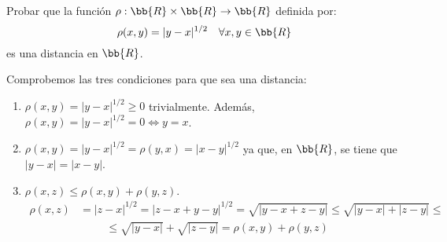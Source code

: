\begin{ejercicio}
    Probar que la función $\rho : \bb{R} \times \bb{R} \rightarrow \bb{R}$ definida por:
    \begin{equation*}
        \rho (x,y)=|y-x|^{1/2} \quad \forall x,y \in \bb{R}
    \end{equation*}
    es una distancia en $\bb{R}$.

    Comprobemos las tres condiciones para que sea una distancia:
    \begin{enumerate}
        \item $\rho (x,y)=|y-x|^{1/2}\geq 0$ trivialmente. Además, $\rho (x,y)=|y-x|^{1/2}=0 \Longleftrightarrow y=x$.

        \item $\rho (x,y)=|y-x|^{1/2}=\rho (y,x)=|x-y|^{1/2}$ ya que, en $\bb{R}$, se tiene que $|y-x|=|x-y|$.

        \item $\rho (x,z)\leq \rho (x,y) + \rho(y,z)$.
        \begin{equation*}\begin{split}
            \rho (x,z)&=|z-x|^{1/2} = |z-x+y-y|^{1/2} = \sqrt{|y-x+z-y|}
            \leq \sqrt{|y-x|+|z-y|} \leq \\
            & \hspace{1cm} \leq \sqrt{|y-x|} + \sqrt{|z-y|} = \rho (x,y) + \rho(y,z)
        \end{split}\end{equation*}
    \end{enumerate}
    
\end{ejercicio}

